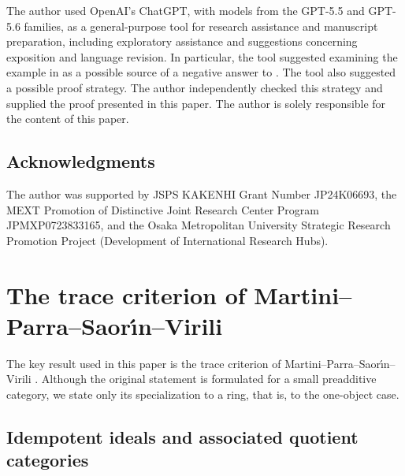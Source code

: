 \documentclass[a4paper,10pt,reqno]{amsart}
\theoremstyle{definition}
\theoremstyle{plain}
\numberwithin{equation}{section}
\begin{document}
The author used OpenAI's ChatGPT, with models from the GPT-5.5 and GPT-5.6 families, as a general-purpose tool for research assistance and manuscript preparation, including exploratory assistance and suggestions concerning exposition and language revision. In particular, the tool suggested examining the example in \cite[Section~8]{MR4915561} as a possible source of a negative answer to \cite[Problem~5.13]{arXiv:2508.00670v2}. The tool also suggested a possible proof strategy. The author independently checked this strategy and supplied the proof presented in this paper. The author is solely responsible for the content of this paper.

\subsection*{Acknowledgments}

The author was supported by JSPS KAKENHI Grant Number JP24K06693, the MEXT Promotion of Distinctive Joint Research Center Program JPMXP0723833165, and the Osaka Metropolitan University Strategic Research Promotion Project (Development of International Research Hubs).

\section{The trace criterion of Martini--Parra--Saor\'{\i}n--Virili}
\label{69412037}

The key result used in this paper is the trace criterion of Martini--Parra--Saor\'{\i}n--Virili \cite[Theorem~5.7]{arXiv:2508.00670v2}. Although the original statement is formulated for a small preadditive category, we state only its specialization to a ring, that is, to the one-object case.

\subsection{Idempotent ideals and associated quotient categories}
\label{15278364}
\end{document}
